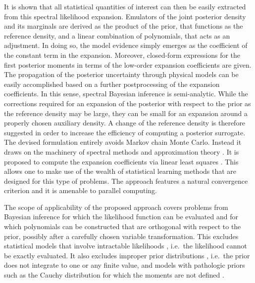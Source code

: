 It is shown that all statistical quantities of interest can then be easily extracted from this spectral likelihood expansion.
Emulators of the joint posterior density and its marginals are derived as the product of the prior,
that functions as the reference density, and a linear combination of polynomials, that acts as an adjustment.
In doing so, the model evidence simply emerges as the coefficient of the constant term in the expansion.
Moreover, closed-form expressions for the first posterior moments in terms of the low-order expansion coefficients are given.
The propagation of the posterior uncertainty through physical models can be easily accomplished based on a further postprocessing of the expansion coefficients.
In this sense, spectral Bayesian inference is semi-analytic.
While the corrections required for an expansion of the posterior with respect to the prior as the reference density may be large,
they can be small for an expansion around a properly chosen auxiliary density.
A change of the reference density is therefore suggested in order to increase the efficiency of computing a posterior surrogate.
The devised formulation entirely avoids Markov chain Monte Carlo.
Instead it draws on the machinery of spectral methods \cite{Math:Boyd2001,Math:Kopriva2009,Math:Shen2011} and approximation theory \cite{Math:Christensen2004,Math:Trigub2004,Math:Trefethen2013}.
It is proposed to compute the expansion coefficients via linear least squares \cite{Statistics:Lawson1995,Statistics:Bjorck1996}.
This allows one to make use of the wealth of statistical learning methods \cite{Statistics:Vapnik2000,Statistics:Hastie2009} that are designed for this type of problems.
The approach features a natural convergence criterion and it is amenable to parallel computing.
\par %
The scope of applicability of the proposed approach covers problems from Bayesian inference for which the likelihood function can be evaluated
and for which polynomials can be constructed that are orthogonal with respect to the prior, possibly after a carefully chosen variable transformation.
This excludes statistical models that involve intractable likelihoods \cite{Bayesian:Marin2012,Bayesian:Sunnaker2013}, i.e.\ the likelihood cannot be exactly evaluated.
It also excludes improper prior distributions \cite{Bayesian:Taraldsen2010,Bayesian:Kitanidis2012}, i.e.\ the prior does not integrate to one or any finite value,
and models with pathologic priors such as the Cauchy distribution for which the moments are not defined \cite{Bayesian:Gelman2008,Bayesian:Fuquene2009}.
